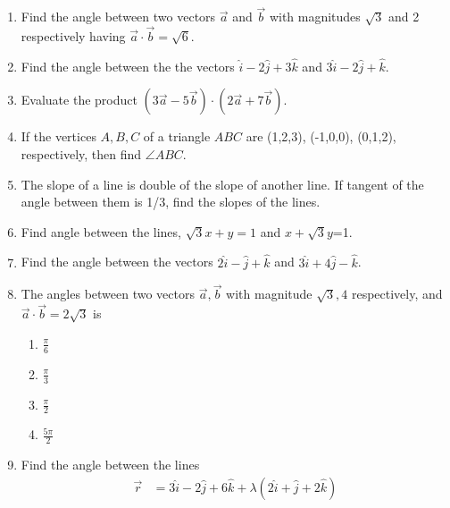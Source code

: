 \begin{enumerate}[label=\thesubsection.\arabic*,ref=\thesubsection.\theenumi]
\item Find the angle between two vectors $\overrightarrow{a}$ and $\overrightarrow {b} $ with magnitudes $\sqrt{3}$ and 2 respectively having $\overrightarrow {a}\cdot\overrightarrow {b}=\sqrt{6}$.
		\label{prob:12/10/3/1/inner}
	\\
	\solution
		
\item Find the angle between the the vectors $\hat{i}-2\hat{j}+3\hat{k}$ and $3\hat{i}-2\hat{j}+\hat{k}$.
	\\
	\solution
		
\item Evaluate the product $(3\overrightarrow {a}-5\overrightarrow {b})\cdot (2\overrightarrow {a}+7\overrightarrow {b})$.
	\\
	\solution
		
\item If the vertices $A,B,C$ of a triangle $ABC$ are (1,2,3), (-1,0,0), (0,1,2), respectively, then find  $\angle{ABC}$.
	\\
	\solution
		
	\item The slope of a line is double of the slope of another line. If tangent of the angle between them is 1/3, find the slopes of the lines.
\label{chapters/11/10/1/11}
\\
\solution 

\item    Find angle between the lines, $\sqrt{3}x+y=1$ and $x+\sqrt{3}y$=1.
\label{chapters/11/10/3/9}
\\
   \solution 

\item Find the angle between the vectors $2\hat{i}-\hat{j}+\hat{k}$ and $3\hat{i}+4\hat{j}-\hat{k}$.
\item The angles between two vectors $\vec{a}, \vec{b}$ with magnitude $\sqrt{3}, 4$ respectively, and $\vec{a} \cdot \vec{b}= 2\sqrt{3}$ is
	\begin{enumerate}
\item $\frac{\pi}{6}$
\item $\frac{\pi}{3}$
\item $\frac{\pi}{2}$ 
\item $\frac{5\pi}{2}$
\end{enumerate}
\item Find the angle between the lines 
\begin{align}
	\overrightarrow{r}&=3\hat{i}-2\hat{j}+6\hat{k}+\lambda(2\hat{i}+\hat{j}+2\hat{k})

\end{align}
\end{enumerate}
